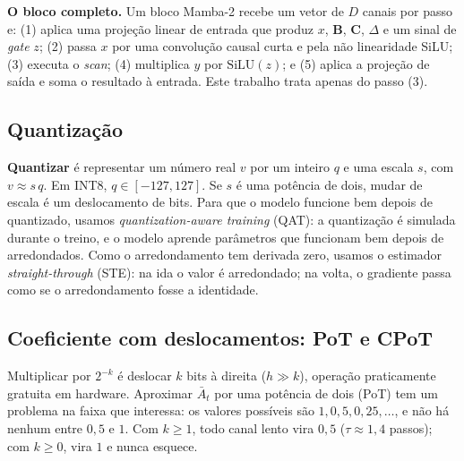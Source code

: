 \documentclass[12pt]{article}
\begin{document}
\textbf{O bloco completo.} Um bloco Mamba-2 recebe um vetor de $D$ canais por passo e: (1) aplica uma projeção linear de entrada que produz $x$, $\mathbf{B}$, $\mathbf{C}$, $\Delta$ e um sinal de \emph{gate} $z$; (2) passa $x$ por uma convolução causal curta e pela não linearidade SiLU; (3) executa o \emph{scan}; (4) multiplica $y$ por $\mathrm{SiLU}(z)$; e (5) aplica a projeção de saída e soma o resultado à entrada. Este trabalho trata apenas do passo (3).

\subsection{Quantização}
\textbf{Quantizar} é representar um número real $v$ por um inteiro $q$ e uma escala $s$, com $v \approx s\,q$. Em INT8, $q \in [-127, 127]$. Se $s$ é uma potência de dois, mudar de escala é um deslocamento de bits. Para que o modelo funcione bem depois de quantizado, usamos \emph{quantization-aware training} (QAT): a quantização é simulada durante o treino, e o modelo aprende parâmetros que funcionam bem depois de arredondados. Como o arredondamento tem derivada zero, usamos o estimador \emph{straight-through} (STE): na ida o valor é arredondado; na volta, o gradiente passa como se o arredondamento fosse a identidade.

\subsection{Coeficiente com deslocamentos: PoT e CPoT}
Multiplicar por $2^{-k}$ é deslocar $k$ bits à direita ($h \gg k$), operação praticamente gratuita em hardware. Aproximar $\bar{A}_t$ por uma potência de dois (PoT) tem um problema na faixa que interessa: os valores possíveis são $1, 0{,}5, 0{,}25, \dots$, e não há nenhum entre $0{,}5$ e $1$. Com $k \geq 1$, todo canal lento vira $0{,}5$ ($\tau \approx 1{,}4$ passos); com $k \geq 0$, vira $1$ e nunca esquece.
\end{document}
